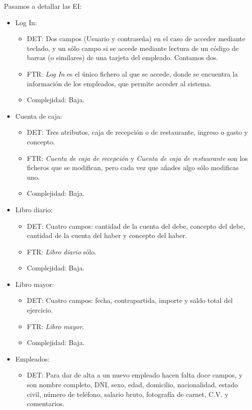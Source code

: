 \documentclass[spanish,a4paper,12pt]{report}	%
\begin{document}
	Pasamos a detallar las EI:
	\begin{itemize}
		\item{Log In:} 
		\begin{itemize}
 			\item{DET:} Dos campos (Usuario y contraseña) en el caso de acceder mediante teclado, y un sólo campo si se accede mediante lectura de un código de barras (o similares) de una tarjeta del empleado. Contamos dos.
			\item{FTR:} \textit{Log In} es el único fichero al que se accede, donde se encuentra la información de los empleados, que permite acceder al sistema.
			\item{Complejidad:} Baja.
		\end{itemize}	
		\item{Cuenta de caja:} 
		\begin{itemize}
 			\item{DET:} Tres atributos, caja de recepción o de restaurante, ingreso o gasto y concepto.
			\item{FTR:} \textit{Cuenta de caja de recepción} y \textit{Cuenta de caja de restaurante} son los ficheros que se modifican, pero cada vez que añades algo sólo modificas uno.
			\item{Complejidad:} Baja.
		\end{itemize}
		\item{Libro diario:} 
		\begin{itemize}
 			\item{DET:} Cuatro campos: cantidad de la cuenta del debe, concepto del debe, cantidad de la cuenta del haber y concepto del haber.
			\item{FTR:} \textit{Libro diario} sólo.
			\item{Complejidad:} Baja.
		\end{itemize}
		\item{Libro mayor:} 
		\begin{itemize}
 			\item{DET:} Cuatro campos: fecha, contrapartida, importe y saldo total del ejercicio.
			\item{FTR:} \textit{Libro mayor}.
			\item{Complejidad:} Baja.
		\end{itemize}
		\item{Empleados:} 
		\begin{itemize}
 			\item{DET:} Para dar de alta a un nuevo empleado hacen falta doce campos, y son nombre completo, DNI, sexo, edad, domicilio, nacionalidad, estado civil, número de teléfono, salario bruto, fotografía de carnet, C.V. y comentarios.

\end{itemize}
\end{itemize}
\end{document}
